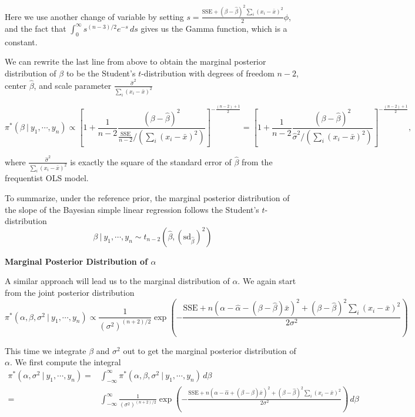 \documentclass[]{book}
\theoremstyle{definition}
\theoremstyle{definition}
\theoremstyle{definition}
\theoremstyle{remark}
\begin{document}
Here we use another change of variable by setting
\(\displaystyle s= \frac{\text{SSE}+(\beta-\hat{\beta})^2\sum_i(x_i-\bar{x})^2}{2}\phi\),
and the fact that \(\displaystyle \int_0^\infty s^{(n-3)/2}e^{-s}\, ds\)
gives us the Gamma function, which is a constant.

We can rewrite the last line from above to obtain the marginal posterior
distribution of \(\beta\) to be the Student's \(t\)-distribution with
degrees of freedom \(n-2\), center \(\hat{\beta}\), and scale parameter
\(\displaystyle \frac{\hat{\sigma}^2}{\sum_i(x_i-\bar{x})^2}\)

\[ \pi^*(\beta~|~y_1,\cdots,y_n) \propto
 \left[1+\frac{1}{n-2}\frac{(\beta - \hat{\beta})^2}{\frac{\text{SSE}}{n-2}/(\sum_i (x_i-\bar{x})^2)}\right]^{-\frac{(n-2)+1}{2}} = \left[1 + \frac{1}{n-2}\frac{(\beta - \hat{\beta})^2}{\hat{\sigma}^2/(\sum_i (x_i-\bar{x})^2)}\right]^{-\frac{(n-2)+1}{2}},
\]

where \(\displaystyle \frac{\hat{\sigma}^2}{\sum_i (x_i-\bar{x})^2}\) is
exactly the square of the standard error of \(\hat{\beta}\) from the
frequentist OLS model.

To summarize, under the reference prior, the marginal posterior
distribution of the slope of the Bayesian simple linear regression
follows the Student's \(t\)-distribution \[ 
\beta ~|~y_1,\cdots, y_n \sim t_{n-2}\left(\hat{\beta}, \left(\text{sd}_{\hat{\beta}}\right)^2\right) 
\]

\textbf{Marginal Posterior Distribution of \(\alpha\)}

A similar approach will lead us to the marginal distribution of
\(\alpha\). We again start from the joint posterior distribution
\[ \pi^*(\alpha, \beta, \sigma^2~|~y_1,\cdots,y_n) \propto \frac{1}{(\sigma^2)^{(n+2)/2}}\exp\left(-\frac{\text{SSE} + n(\alpha-\hat{\alpha}-(\beta-\hat{\beta})\bar{x})^2 + (\beta - \hat{\beta})^2\sum_i (x_i-\bar{x})^2}{2\sigma^2}\right) \]

This time we integrate \(\beta\) and \(\sigma^2\) out to get the
marginal posterior distribution of \(\alpha\). We first compute the
integral \[
\begin{aligned}
\pi^*(\alpha, \sigma^2~|~y_1,\cdots, y_n) = & \int_{-\infty}^\infty \pi^*(\alpha, \beta, \sigma^2~|~y_1,\cdots, y_n)\, d\beta\\
= & \int_{-\infty}^\infty \frac{1}{(\sigma^2)^{(n+2)/2}}\exp\left(-\frac{\text{SSE} + n(\alpha-\hat{\alpha}+(\beta-\hat{\beta})\bar{x})^2 + (\beta - \hat{\beta})^2\sum_i (x_i-\bar{x})^2}{2\sigma^2}\right)\, d\beta 
\end{aligned}
\]
\end{document}
